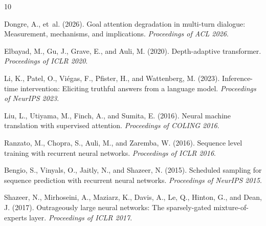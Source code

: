 \documentclass[11pt,a4paper]{article}
\begin{document}



\begin{thebibliography}{10}

Dongre, A., et~al. (2026).
\newblock Goal attention degradation in multi-turn dialogue: Measurement, mechanisms, and implications.
\newblock \emph{Proceedings of ACL 2026}.

Elbayad, M., Gu, J., Grave, E., and Auli, M. (2020).
\newblock Depth-adaptive transformer.
\newblock \emph{Proceedings of ICLR 2020}.

Li, K., Patel, O., Vi{\'e}gas, F., Pfister, H., and Wattenberg, M. (2023).
\newblock Inference-time intervention: Eliciting truthful answers from a language model.
\newblock \emph{Proceedings of NeurIPS 2023}.

Liu, L., Utiyama, M., Finch, A., and Sumita, E. (2016).
\newblock Neural machine translation with supervised attention.
\newblock \emph{Proceedings of COLING 2016}.

Ranzato, M., Chopra, S., Auli, M., and Zaremba, W. (2016).
\newblock Sequence level training with recurrent neural networks.
\newblock \emph{Proceedings of ICLR 2016}.

Bengio, S., Vinyals, O., Jaitly, N., and Shazeer, N. (2015).
\newblock Scheduled sampling for sequence prediction with recurrent neural networks.
\newblock \emph{Proceedings of NeurIPS 2015}.

Shazeer, N., Mirhoseini, A., Maziarz, K., Davis, A., Le, Q., Hinton, G., and Dean, J. (2017).
\newblock Outrageously large neural networks: The sparsely-gated mixture-of-experts layer.
\newblock \emph{Proceedings of ICLR 2017}.

\end{thebibliography}
\end{document}
